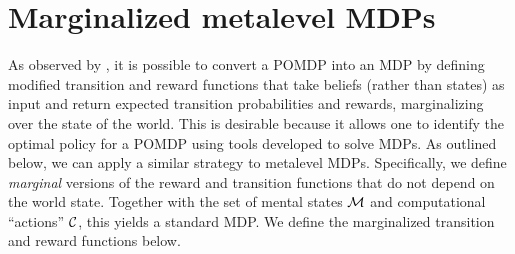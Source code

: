 \section{Marginalized metalevel MDPs}\label{sec:metamdp-marginalized}

As observed by \citet{kaelbling1998planningb}, it is possible to convert a POMDP into an MDP by defining modified transition and reward functions that take beliefs (rather than states) as input and return expected transition probabilities and rewards, marginalizing over the state of the world. This is desirable because it allows one to identify the optimal policy for a POMDP using tools developed to solve MDPs. As outlined below, we can apply a similar strategy to metalevel MDPs. Specifically, we define \emph{marginal} versions of the reward and transition functions that do not depend on the world state. Together with the set of mental states $\mathcal{M}$ and computational ``actions'' $\mathcal{C}$, this yields a standard MDP. We define the marginalized transition and reward functions below.



